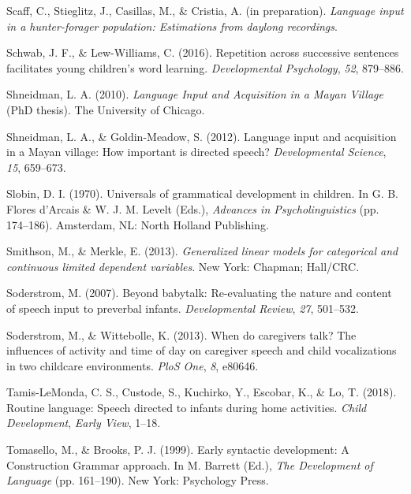 \documentclass[,man,floatsintext]{apa6}
\begin{document}
\hypertarget{ref-scaffIPlanguage}{}
Scaff, C., Stieglitz, J., Casillas, M., \& Cristia, A. (in preparation).
\emph{Language input in a hunter-forager population: Estimations from
daylong recordings}.

\hypertarget{ref-schwab2016repetition}{}
Schwab, J. F., \& Lew-Williams, C. (2016). Repetition across successive
sentences facilitates young children's word learning.
\emph{Developmental Psychology}, \emph{52}, 879--886.

\hypertarget{ref-shneidman2010language}{}
Shneidman, L. A. (2010). \emph{Language Input and Acquisition in a Mayan
Village} (PhD thesis). The University of Chicago.

\hypertarget{ref-shneidman2012language}{}
Shneidman, L. A., \& Goldin-Meadow, S. (2012). Language input and
acquisition in a Mayan village: How important is directed speech?
\emph{Developmental Science}, \emph{15}, 659--673.

\hypertarget{ref-slobin1970universals}{}
Slobin, D. I. (1970). Universals of grammatical development in children.
In G. B. Flores d'Arcais \& W. J. M. Levelt (Eds.), \emph{Advances in
Psycholinguistics} (pp. 174--186). Amsterdam, NL: North Holland
Publishing.

\hypertarget{ref-smithson2013generalized}{}
Smithson, M., \& Merkle, E. (2013). \emph{Generalized linear models for
categorical and continuous limited dependent variables}. New York:
Chapman; Hall/CRC.

\hypertarget{ref-soderstrom2007beyond}{}
Soderstrom, M. (2007). Beyond babytalk: Re-evaluating the nature and
content of speech input to preverbal infants. \emph{Developmental
Review}, \emph{27}, 501--532.

\hypertarget{ref-soderstrom2013when}{}
Soderstrom, M., \& Wittebolle, K. (2013). When do caregivers talk? The
influences of activity and time of day on caregiver speech and child
vocalizations in two childcare environments. \emph{PloS One}, \emph{8},
e80646.

\hypertarget{ref-tamislemonda2018routine}{}
Tamis-LeMonda, C. S., Custode, S., Kuchirko, Y., Escobar, K., \& Lo, T.
(2018). Routine language: Speech directed to infants during home
activities. \emph{Child Development}, \emph{Early View}, 1--18.

\hypertarget{ref-tomasello1999early}{}
Tomasello, M., \& Brooks, P. J. (1999). Early syntactic development: A
Construction Grammar approach. In M. Barrett (Ed.), \emph{The
Development of Language} (pp. 161--190). New York: Psychology Press.
\end{document}
